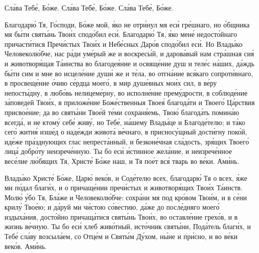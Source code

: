 \begin{mymulticols}

Сл\'{а}ва Теб\'{е}, Б\'{о}же. Сл\'{а}ва Теб\'{е}, Б\'{о}же. Сл\'{а}ва Теб\'{е}, Б\'{о}же.


Благодар\'{ю} Тя, Г\'{о}споди, Б\'{о}же мой, \'{я}ко не отр\'{и}нул мя ес\'{и} гр\'{е}шнаго, но \'{о}бщника мя б\'{ы}ти свят\'{ы}нь Тво\'{и}х спод\'{о}бил ес\'{и}. Благодар\'{ю} Тя, \'{я}ко мен\'{е} недост\'{о}йнаго причаст\'{и}тися Преч\'{и}стых Тво\'{и}х и Неб\'{е}сных Дар\'{о}в спод\'{о}бил ес\'{и}. Но Влад\'{ы}ко Человекол\'{ю}бче, нас р\'{а}ди ум\'{е}рый же и воскрес\'{ы}й, и даров\'{а}вый нам стр\'{а}шная си\'{я} и животвор\'{я}щая Т\'{а}инства во благоде\'{я}ние и освящ\'{е}ние душ и тел\'{е}с н\'{а}ших, д\'{а}ждь б\'{ы}ти сим и мне во исцел\'{е}ние душ\'{и} же и т\'{е}ла, во отгн\'{а}ние вс\'{я}каго сопрот\'{и}внаго, в просвещ\'{е}ние \'{о}чию с\'{е}рдца моег\'{о}, в мир душ\'{е}вных мо\'{и}х сил, в в\'{е}ру непост\'{ы}дну, в люб\'{о}вь нелицем\'{е}рну, во исполн\'{е}ние прем\'{у}дрости, в соблюд\'{е}ние з\'{а}поведей Тво\'{и}х, в прилож\'{е}ние Бож\'{е}ственныя Твое\'{я} благод\'{а}ти и Твоег\'{о} Ц\'{а}рствия присво\'{е}ние; да во свят\'{ы}ни Тво\'{е}й т\'{е}ми сохран\'{я}емь, Тво\'{ю} благод\'{а}ть помин\'{а}ю всегд\'{а}, и не ктом\'{у} себ\'{е} жив\'{у}, но Теб\'{е}, н\'{а}шему Влад\'{ы}це и Благод\'{е}телю; и т\'{а}ко сег\'{о} жити\'{я} изш\'{е}д о над\'{е}жди живот\'{а} в\'{е}чнаго, в приснос\'{у}щный дост\'{и}гну пок\'{о}й, ид\'{е}же пр\'{а}зднующих глас непрест\'{а}нный, и безкон\'{е}чная сл\'{а}дость, зр\'{я}щих Твоег\'{о} лиц\'{а} добр\'{о}ту неизреч\'{е}нную. Ты бо ес\'{и} \'{и}стинное жел\'{а}ние, и неизреч\'{е}нное вес\'{е}лие л\'{ю}бящих Тя, Христ\'{е} Б\'{о}же наш, и Тя по\'{е}т вс\'{я} тварь во в\'{е}ки. Ам\'{и}нь.


Влад\'{ы}ко Христ\'{е} Б\'{о}же, Цар\'{ю} век\'{о}в, и Сод\'{е}телю всех, благодар\'{ю} Тя о всех, \'{я}же ми п\'{о}дал благ\'{и}х, и о причащ\'{е}нии преч\'{и}стых и животвор\'{я}щих Тво\'{и}х Т\'{а}инств. Мол\'{ю} \'{у}бо Тя, Бл\'{а}же и Человекол\'{ю}бче: сохр\'{а}ни мя под кр\'{о}вом Тво\'{и}м, и в с\'{е}ни крил\'{у} Тво\'{е}ю; и д\'{а}руй ми ч\'{и}стою с\'{о}вестию, д\'{а}же до посл\'{е}дняго моег\'{о} издых\'{а}ния, дост\'{о}йно причащ\'{а}тися свят\'{ы}нь Тво\'{и}х, во оставл\'{е}ние грех\'{о}в, и в жизнь в\'{е}чную. Ты бо ес\'{и} хлеб жив\'{о}тный, ист\'{о}чник свят\'{ы}ни, Под\'{а}тель благ\'{и}х, и Теб\'{е} сл\'{а}ву возсыл\'{а}ем, со Отц\'{е}м и Свят\'{ы}м Д\'{у}хом, н\'{ы}не и пр\'{и}сно, и во в\'{е}ки век\'{о}в. Ам\'{и}нь.


\end{mymulticols}
